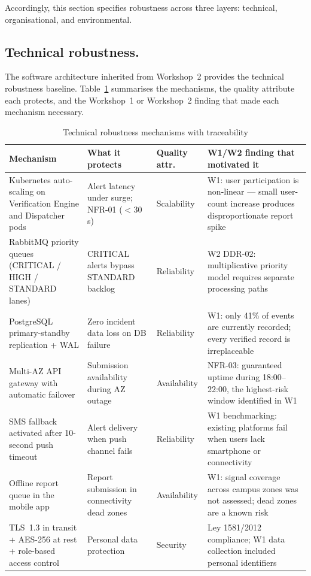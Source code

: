 \documentclass[12pt,a4paper]{article}
\begin{document}
Accordingly, this section specifies robustness across three
layers: technical, organisational, and environmental.

\subsection{Technical robustness.}
The software architecture inherited from Workshop~2 provides the
technical robustness baseline. Table~\ref{tab:techrobust} summarises
the mechanisms, the quality attribute each protects, and the
Workshop~1 or Workshop~2 finding that made each mechanism necessary.

\begin{table}[h]
\caption{Technical robustness mechanisms with traceability}
\label{tab:techrobust}
\centering
\begin{tabularx}{\textwidth}{p{3.2cm}Xp{2.8cm}p{3.5cm}}
\toprule
\textbf{Mechanism} & \textbf{What it protects} & \textbf{Quality attr.} & \textbf{W1/W2 finding that motivated it} \\
\midrule
Kubernetes auto-scaling on Verification Engine and Dispatcher pods & Alert latency under surge; NFR-01 ($<$30\,s) & Scalability & W1: user participation is non-linear — small user-count increase produces disproportionate report spike \\
RabbitMQ priority queues (CRITICAL / HIGH / STANDARD lanes) & CRITICAL alerts bypass STANDARD backlog & Reliability & W2 DDR-02: multiplicative priority model requires separate processing paths \\
PostgreSQL primary-standby replication + WAL & Zero incident data loss on DB failure & Reliability & W1: only 41\% of events are currently recorded; every verified record is irreplaceable \\
Multi-AZ API gateway with automatic failover & Submission availability during AZ outage & Availability & NFR-03: guaranteed uptime during 18:00--22:00, the highest-risk window identified in W1 \\
SMS fallback activated after 10-second push timeout & Alert delivery when push channel fails & Reliability & W1 benchmarking: existing platforms fail when users lack smartphone or connectivity \\
Offline report queue in the mobile app & Report submission in connectivity dead zones & Availability & W1: signal coverage across campus zones was not assessed; dead zones are a known risk \\
TLS~1.3 in transit + AES-256 at rest + role-based access control & Personal data protection & Security & Ley 1581/2012 compliance; W1 data collection included personal identifiers \\
\bottomrule
\end{tabularx}
\end{table}
\end{document}
